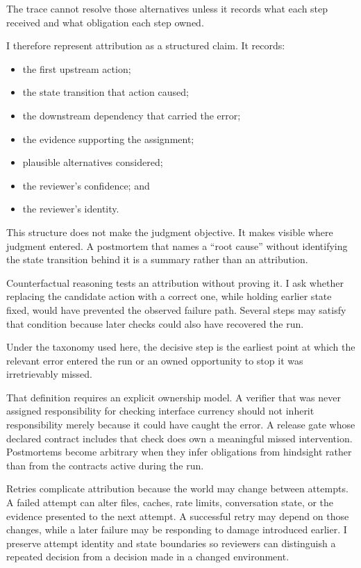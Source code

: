 The trace cannot resolve those alternatives unless it records what each step received and what obligation each step owned.

I therefore represent attribution as a structured claim. It records:

\begin{itemize}
\tightlist
\item
  the first upstream action;
\item
  the state transition that action caused;
\item
  the downstream dependency that carried the error;
\item
  the evidence supporting the assignment;
\item
  plausible alternatives considered;
\item
  the reviewer's confidence; and
\item
  the reviewer's identity.
\end{itemize}

This structure does not make the judgment objective. It makes visible where judgment entered. A postmortem that names a ``root cause'' without identifying the state transition behind it is a summary rather than an attribution.

Counterfactual reasoning tests an attribution without proving it. I ask whether replacing the candidate action with a correct one, while holding earlier state fixed, would have prevented the observed failure path. Several steps may satisfy that condition because later checks could also have recovered the run.

Under the taxonomy used here, the decisive step is the earliest point at which the relevant error entered the run or an owned opportunity to stop it was irretrievably missed.

That definition requires an explicit ownership model. A verifier that was never assigned responsibility for checking interface currency should not inherit responsibility merely because it could have caught the error. A release gate whose declared contract includes that check does own a meaningful missed intervention. Postmortems become arbitrary when they infer obligations from hindsight rather than from the contracts active during the run.

Retries complicate attribution because the world may change between attempts. A failed attempt can alter files, caches, rate limits, conversation state, or the evidence presented to the next attempt. A successful retry may depend on those changes, while a later failure may be responding to damage introduced earlier. I preserve attempt identity and state boundaries so reviewers can distinguish a repeated decision from a decision made in a changed environment.

